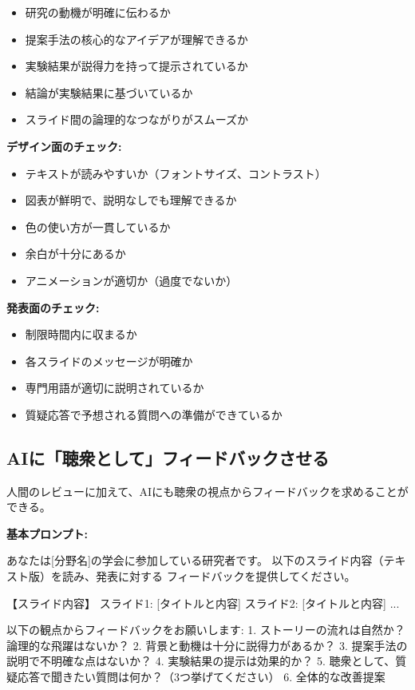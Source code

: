 \begin{itemize}
\item 研究の動機が明確に伝わるか
\item 提案手法の核心的なアイデアが理解できるか
\item 実験結果が説得力を持って提示されているか
\item 結論が実験結果に基づいているか
\item スライド間の論理的なつながりがスムーズか
\end{itemize}

\textbf{デザイン面のチェック:}

\begin{itemize}
\item テキストが読みやすいか（フォントサイズ、コントラスト）
\item 図表が鮮明で、説明なしでも理解できるか
\item 色の使い方が一貫しているか
\item 余白が十分にあるか
\item アニメーションが適切か（過度でないか）
\end{itemize}

\textbf{発表面のチェック:}

\begin{itemize}
\item 制限時間内に収まるか
\item 各スライドのメッセージが明確か
\item 専門用語が適切に説明されているか
\item 質疑応答で予想される質問への準備ができているか
\end{itemize}

\subsection{AIに「聴衆として」フィードバックさせる}

人間のレビューに加えて、AIにも聴衆の視点からフィードバックを求めることができる。

\textbf{基本プロンプト:}

\begin{promptbox}
あなたは[分野名]の学会に参加している研究者です。
以下のスライド内容（テキスト版）を読み、発表に対する
フィードバックを提供してください。

【スライド内容】
スライド1: [タイトルと内容]
スライド2: [タイトルと内容]
...

以下の観点からフィードバックをお願いします:
1. ストーリーの流れは自然か？論理的な飛躍はないか？
2. 背景と動機は十分に説得力があるか？
3. 提案手法の説明で不明確な点はないか？
4. 実験結果の提示は効果的か？
5. 聴衆として、質疑応答で聞きたい質問は何か？（3つ挙げてください）
6. 全体的な改善提案
\end{promptbox}

